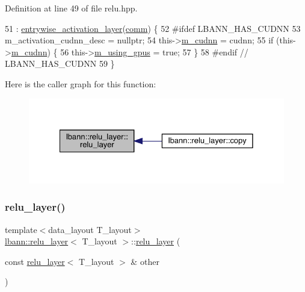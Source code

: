 Definition at line 49 of file relu.\+hpp.


\begin{DoxyCode}
51     : \hyperlink{classlbann_1_1entrywise__activation__layer_aada1d9200612dcd13259799ef327c557}{entrywise\_activation\_layer}(\hyperlink{file__io_8cpp_ab048c6f9fcbcfaa57ce68b00263dbebe}{comm}) \{
52 \textcolor{preprocessor}{  #ifdef LBANN\_HAS\_CUDNN}
53     m\_activation\_cudnn\_desc = \textcolor{keyword}{nullptr};
54     this->\hyperlink{classlbann_1_1Layer_a08dbb94239e3b8c96329786c57c72e21}{m\_cudnn} = cudnn;
55     \textcolor{keywordflow}{if} (this->\hyperlink{classlbann_1_1Layer_a08dbb94239e3b8c96329786c57c72e21}{m\_cudnn}) \{
56       this->\hyperlink{classlbann_1_1Layer_af7881cb5eff5207c15fa835d65462e8f}{m\_using\_gpus} = \textcolor{keyword}{true};
57     \}
58 \textcolor{preprocessor}{  #endif // LBANN\_HAS\_CUDNN}
59   \}
\end{DoxyCode}
Here is the caller graph for this function\+:\nopagebreak
\begin{figure}[H]
\begin{center}
\leavevmode
\includegraphics[width=328pt]{classlbann_1_1relu__layer_af4739658d074a62cd71ce0ca7e791c06_icgraph}
\end{center}
\end{figure}
\mbox{\label{classlbann_1_1relu__layer_a0f0463a71fa389c6273a035d3ae4dbf6}} 
\subsubsection{\texorpdfstring{relu\+\_\+layer()}{relu\_layer()}\hspace{0.1cm}{\footnotesize\ttfamily [2/2]}}
{\footnotesize\ttfamily template$<$data\+\_\+layout T\+\_\+layout$>$ \\
\hyperlink{classlbann_1_1relu__layer}{lbann\+::relu\+\_\+layer}$<$ T\+\_\+layout $>$\+::\hyperlink{classlbann_1_1relu__layer}{relu\+\_\+layer} (\begin{DoxyParamCaption}\item[{const \hyperlink{classlbann_1_1relu__layer}{relu\+\_\+layer}$<$ T\+\_\+layout $>$ \&}]{other }\end{DoxyParamCaption})\hspace{0.3cm}{\ttfamily [inline]}}



